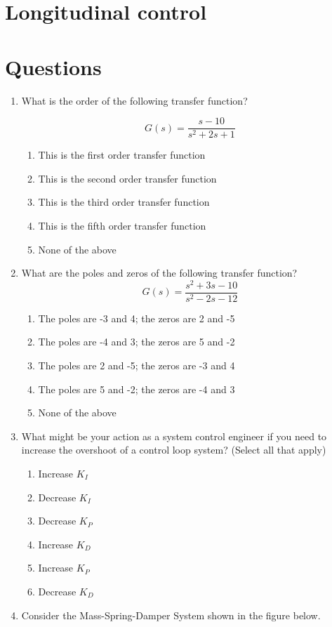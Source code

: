 \section{Longitudinal control}
\label{longitudinal_control}

\section{Questions}
\label{questions_longitudinal_control}

\begin{enumerate}
\item What is the order of the following transfer function?

\begin{equation}
G(s) = \frac{s-10}{s^2 + 2s +1}
\end{equation}
	\begin{enumerate}
		\item  This is the first order transfer function
		\item This is the second order transfer function
		\item This is the third order transfer function
		\item This is the fifth order transfer function
		\item None of the above
	\end{enumerate}
	
\item What are the poles and zeros of the following transfer function?
\begin{equation}
G(s) = \frac{s^2 +3s-10}{s^2 - 2s -12}
\end{equation}
	\begin{enumerate}
		\item  The poles are -3 and 4; the zeros are 2 and -5
		\item The poles are -4 and 3; the zeros are 5 and -2
		\item The poles are 2 and -5; the zeros are -3 and 4
		\item The poles are 5 and -2; the zeros are -4 and 3
		\item None of the above
	\end{enumerate}
\item What might be your action as a system control engineer if you need to increase the overshoot of a control loop system? (Select all that apply)
	\begin{enumerate}
		\item Increase $K_I$
		\item Decrease $K_I$​
		\item Decrease $K_P$ ​
		\item Increase $K_D$ 
		\item Increase $K_P$​
		\item Decrease $K_D$​
	\end{enumerate}
\item Consider the Mass-Spring-Damper System shown in the figure below.


\end{enumerate}
